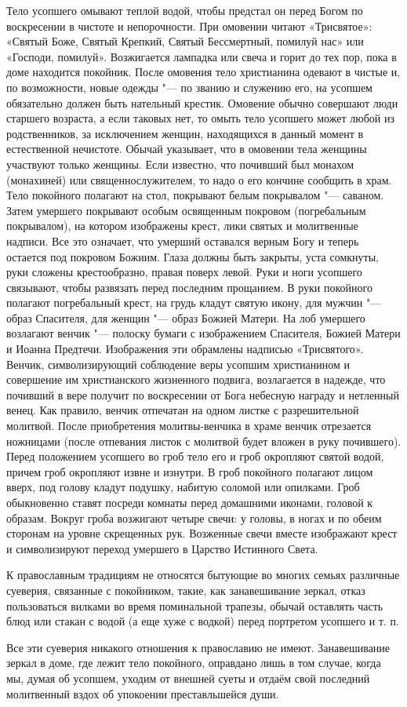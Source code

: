 \begin{mymulticols}
Тело усопшего омывают теплой водой, чтобы предстал он перед Богом по воскресении в чистоте и непорочности. При омовении читают «Трисвятое»: «Святый Боже, Святый Крепкий, Святый Бессмертный, помилуй нас» или «Господи, помилуй». Возжигается лампадка или свеча и горит до тех пор, пока в доме находится покойник. После омовения тело христианина одевают в чистые и, по возможности, новые одежды "--- по званию и служению его, на усопшем обязательно должен быть нательный крестик. Омовение обычно совершают люди старшего возраста, а если таковых нет, то омыть тело усопшего может любой из родственников, за исключением женщин, находящихся в данный момент в естественной нечистоте. Обычай указывает, что в омовении тела женщины участвуют только женщины. Если известно, что почивший был монахом (монахиней) или священнослужителем, то надо о его кончине сообщить в храм. Тело покойного полагают на стол, покрывают белым покрывалом "--- саваном. Затем умершего покрывают особым освященным покровом (погребальным покрывалом), на котором изображены крест, лики святых и молитвенные надписи. Все это означает, что умерший оставался верным Богу и теперь остается под покровом Божиим. Глаза должны быть закрыты, уста сомкнуты, руки сложены крестообразно, правая поверх левой. Руки и ноги усопшего связывают, чтобы развязать перед последним прощанием. В руки покойного полагают погребальный крест, на грудь кладут святую икону, для мужчин "--- образ Спасителя, для женщин "--- образ Божией Матери. На лоб умершего возлагают венчик "--- полоску бумаги с изображением Спасителя, Божией Матери и Иоанна Предтечи. Изображения эти обрамлены надписью «Трисвятого». Венчик, символизирующий соблюдение веры усопшим христианином и совершение им христианского жизненного подвига, возлагается в надежде, что почивший в вере получит по воскресении от Бога небесную награду и нетленный венец. Как правило, венчик отпечатан на одном листке с разрешительной молитвой. После приобретения молитвы-венчика в храме венчик отрезается ножницами (после отпевания листок с молитвой будет вложен в руку почившего). Перед положением усопшего во гроб тело его и гроб окропляют святой водой, причем гроб окропляют извне и изнутри. В гроб покойного полагают лицом вверх, под голову кладут подушку, набитую соломой или опилками. Гроб обыкновенно ставят посреди комнаты перед домашними иконами, головой к образам. Вокруг гроба возжигают четыре свечи: у головы, в ногах и по обеим сторонам на уровне скрещенных рук. Возженные свечи вместе изображают крест и символизируют переход умершего в Царство Истинного Света. 

К православным традициям не относятся бытующие во многих семьях различные суеверия, связанные с покойником, такие, как занавешивание зеркал, отказ пользоваться вилками во время поминальной трапезы, обычай оставлять часть блюд или стакан с водой (а еще хуже с водкой) перед портретом усопшего и т. п. 

Все эти суеверия никакого отношения к православию не имеют. Занавешивание зеркал в доме, где лежит тело покойного, оправдано лишь в том случае, когда мы, думая об усопшем, уходим от внешней суеты и отдаём свой последний молитвенный вздох об упокоении преставльшейся души.

\end{mymulticols}

